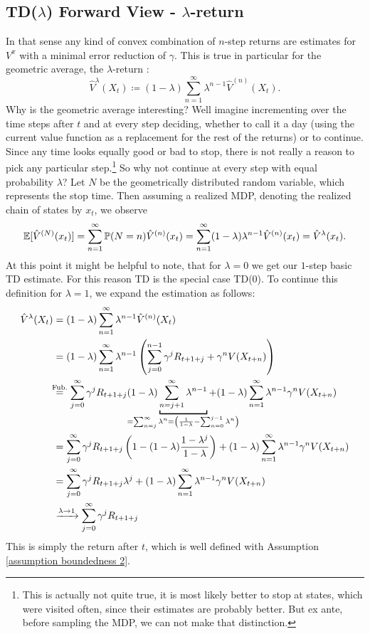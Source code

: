 \subsection{TD(\(\lambda\)) Forward View - \(\lambda\)-return}
In that sense any kind of convex combination of \(n\)-step returns are estimates for \(V^\pi\) with a minimal error reduction of \(\gamma\). This is true in particular for the geometric average, the \(\lambda\)-return \parencite{watkinsLearningDelayedRewards1989}:
\[
	\hat{V}^\lambda(X_t)\coloneqq (1-\lambda)\sum_{n=1}^\infty \lambda^{n-1} \hat{V}^{(n)}(X_t).
\]
Why is the geometric average interesting? Well imagine incrementing over the time steps after \(t\) and at every step deciding, whether to call it a day (using the current value function as a replacement for the rest of the returns) or to continue. Since any time looks equally good or bad to stop, there is not really a reason to pick any particular step.\footnote{This is actually not quite true, it is most likely better to stop at states, which were visited often, since their estimates are probably better. But ex ante, before sampling the MDP, we can not make that distinction.} So why not continue at every step with equal probability \(\lambda\)? Let \(N\) be the geometrically distributed random variable, which represents the stop time. Then assuming a realized MDP, denoting the realized chain of states by \(x_t\), we observe
\[
	\mathbb{E}[\hat{V}^{(N)}(x_t)]=\sum_{n=1}^\infty \mathbb{P}(N=n) \hat{V}^{(n)}(x_t) 
	=\sum_{n=1}^\infty (1-\lambda)\lambda^{n-1} \hat{V}^{(n)}(x_t)=\hat{V}^\lambda (x_t).
\]
At this point it might be helpful to note, that for \(\lambda=0\) we get our \(1\)-step basic TD estimate. For this reason TD is the special case TD(\(0\)). To continue this definition for \(\lambda=1\), we expand the estimation as follows:
\begin{align}
	\hat{V}^\lambda(X_t)&=(1-\lambda)\sum_{n=1}^\infty \lambda^{n-1} \hat{V}^{(n)}(X_t)
	\nonumber\\
	&=(1-\lambda)\sum_{n=1}^\infty \lambda^{n-1}
	\left(
		\sum_{j=0}^{n-1}\gamma^j R_{t+1+j} + \gamma^n V(X_{t+n})
	\right)
	\nonumber\\
	&\lxeq{\text{Fub.}}\sum_{j=0}^\infty \gamma^j R_{t+1+j} 
	(1-\lambda)\underbracket[1pt]{\sum_{n=j+1}^\infty \lambda^{n-1}}_{
		\mathclap{=\sum_{n=j}^\infty \lambda^n = \left(\frac{1}{1-\lambda} - \sum_{n=0}^{j-1}\lambda^n\right)}
	}
	+ (1-\lambda) \sum_{n=1}^\infty \lambda^{n-1}\gamma^n V(X_{t+n})
	\nonumber\\
	&=\sum_{j=0}^\infty \gamma^j R_{t+1+j} 
	\left(1- (1-\lambda)\frac{1-\lambda^j}{1-\lambda} \right) 
	+ (1-\lambda)\sum_{n=1}^\infty \lambda^{n-1}\gamma^n V(X_{t+n})
	\nonumber\\
	&=\sum_{j=0}^\infty \gamma^j R_{t+1+j} \lambda^j 
	+ (1-\lambda)\sum_{n=1}^\infty \lambda^{n-1}\gamma^n V(X_{t+n})
	\label{tangent backward view}\\
	&\xrightarrow{\lambda \to 1} \sum_{j=0}^\infty \gamma^j R_{t+1+j}
	\nonumber
\end{align}
This is simply the return after \(t\), which is well defined with Assumption \ref{assumption boundedness 2}.

